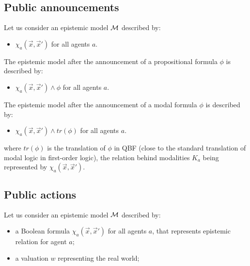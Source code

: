 \documentclass{article}
\begin{document}
\subsection{Public announcements}



Let us consider an epistemic model $\mathcal M$ described by:
\begin{itemize}
	\item $\chi_a(\vec x, \vec x')$ for all agents $a$.
\end{itemize}


The epistemic model after the announcement of a propositional formula $\phi$ is described by:
\begin{itemize}
	\item $\chi_a(\vec x, \vec x')\land \phi$ for all agents $a$.
\end{itemize}


The epistemic model after the announcement of a modal formula $\phi$ is described by:
\begin{itemize}
	\item $\chi_a(\vec x, \vec x') \land tr(\phi)$ for all agents $a$.
\end{itemize}

where $tr(\phi)$ is the translation of $\phi$ in QBF (close to the standard translation of modal logic in first-order logic), the relation behind modalities $K_a$ being represented by $\chi_a(\vec x, \vec x')$.












\subsection{Public actions}

Let us consider an epistemic model $\mathcal M$ described by:
\begin{itemize}
	\item a Boolean formula $\chi_a(\vec x, \vec x')$ for all agents $a$, that represents epistemic relation for agent $a$;
	\item a valuation $w$ representing the real world;
\end{itemize}
\end{document}

